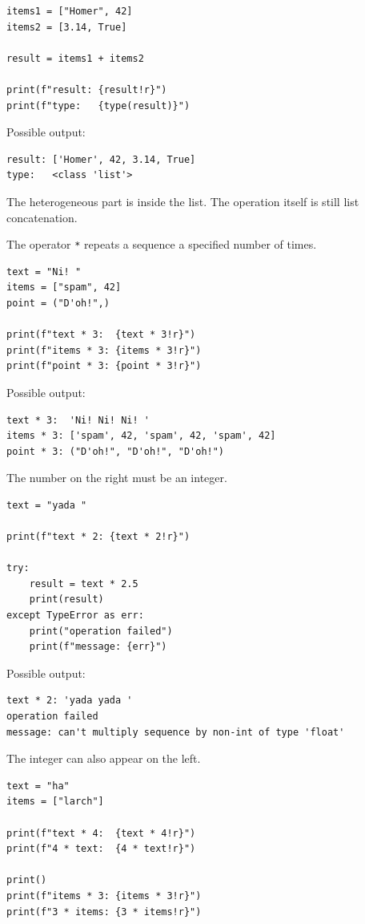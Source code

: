 \begin{verbatim}
items1 = ["Homer", 42]
items2 = [3.14, True]

result = items1 + items2

print(f"result: {result!r}")
print(f"type:   {type(result)}")
\end{verbatim}

Possible output:

\begin{verbatim}
result: ['Homer', 42, 3.14, True]
type:   <class 'list'>
\end{verbatim}

The heterogeneous part is inside the list. The operation itself is still list concatenation.

The operator \texttt{*} repeats a sequence a specified number of times.

\begin{verbatim}
text = "Ni! "
items = ["spam", 42]
point = ("D'oh!",)

print(f"text * 3:  {text * 3!r}")
print(f"items * 3: {items * 3!r}")
print(f"point * 3: {point * 3!r}")
\end{verbatim}

Possible output:

\begin{verbatim}
text * 3:  'Ni! Ni! Ni! '
items * 3: ['spam', 42, 'spam', 42, 'spam', 42]
point * 3: ("D'oh!", "D'oh!", "D'oh!")
\end{verbatim}

The number on the right must be an integer.

\begin{verbatim}
text = "yada "

print(f"text * 2: {text * 2!r}")

try:
    result = text * 2.5
    print(result)
except TypeError as err:
    print("operation failed")
    print(f"message: {err}")
\end{verbatim}

Possible output:

\begin{verbatim}
text * 2: 'yada yada '
operation failed
message: can't multiply sequence by non-int of type 'float'
\end{verbatim}

The integer can also appear on the left.

\begin{verbatim}
text = "ha"
items = ["larch"]

print(f"text * 4:  {text * 4!r}")
print(f"4 * text:  {4 * text!r}")

print()
print(f"items * 3: {items * 3!r}")
print(f"3 * items: {3 * items!r}")
\end{verbatim}

